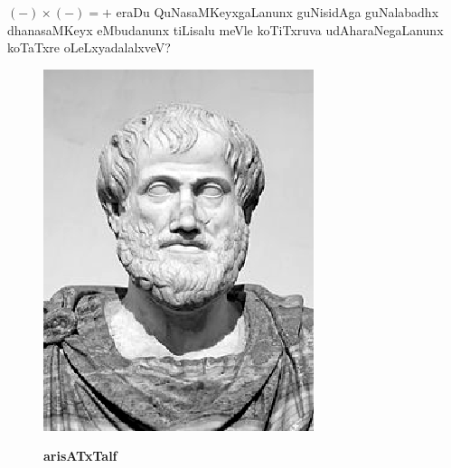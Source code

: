 $(-) \times (-) = +$ eraDu QuNasaMKeyxgaLanunx guNisidAga guNalabadhx dhanasaMKeyx eMbudanunx tiLisalu meVle koTiTxruva udAharaNegaLanunx koTaTxre oLeLxyadalalxveV?
\begin{figure}[H]
  \centering\includegraphics{src/figures/Aristotle_1.eps}
  
  {\bf arisATxTalf} 
     \end{figure}
   
